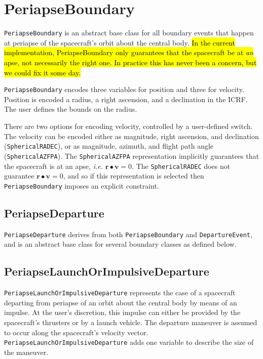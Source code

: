 \section{PeriapseBoundary}
\label{sec:periapseboundary}

\texttt{PeriapseBoundary} is an abstract base class for all boundary events that happen at periapse of the spacecraft's orbit about the central body. \hl{In the current implementation, PeriapseBoundary only guarantees that the spacecraft be at \textit{an} apse, not necessarily the right one. In practice this has never been a concern, but we could fix it some day.}

\texttt{PeriapseBoundary} encodes three variables for position and three for velocity. Position is encoded a radius, a right ascension, and a declination in the \ac{ICRF}. The user defines the bounds on the radius.

There are two options for encoding velocity, controlled by a user-defined switch. The velocity can be encoded either as magnitude, right ascension, and declination (\texttt{SphericalRADEC}), or as magnitude, azimuth, and flight path angle (\texttt{SphericalAZFPA}). The \texttt{SphericalAZFPA} representation implicitly guarantees that the spacecraft is at an apse, \textit{i.e.} $\mathbf{r} \bullet \mathbf{v} = 0$. The \texttt{SphericalRADEC} does not guarantee $\mathbf{r} \bullet \mathbf{v} = 0$, and so if this representation is selected then \texttt{PeriapseBoundary} imposes an explicit constraint.

\subsection{PeriapseDeparture}
\label{subsec:PeriapseDeparture}

\texttt{PeriapseDeparture} derives from both \texttt{PeriapseBoundary} and \texttt{DepartureEvent}, and is an abstract base class for several boundary classes as defined below.

\subsection{PeriapseLaunchOrImpulsiveDeparture}
\label{subsec:PeriapseLaunchOrImpulsiveDeparture}

\texttt{PeriapseLaunchOrImpulsiveDeparture} represents the case of a spacecraft departing from periapse of an orbit about the central body by means of an impulse. At the user's discretion, this impulse can either be provided by the spacecraft's thrusters or by a launch vehicle. The departure maneuver is assumed to occur along the spacecraft's velocity vector. \texttt{PeriapseLaunchOrImpulsiveDeparture} adds one variable to describe the size of the maneuver.

